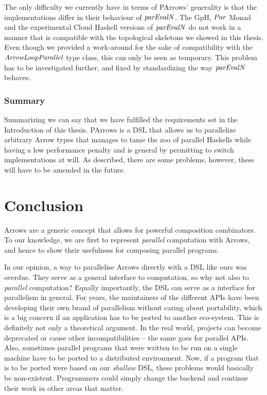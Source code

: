 \documentclass[paper=A4,twoside=true,openright,parskip=full,chapterprefix=true,headings=normal,bibliography=totoc,listof=totoc,titlepage=on,captions=tableabove,draft=false,british]{scrreprt}%
\begin{document}
The only difficulty we currently have in terms of PArrows' generality is
that the implementations differ in their behaviour of \ensuremath{\Varid{parEvalN}}. The
GpH, \ensuremath{\Conid{Par}} Monad and the experimental Cloud Haskell versions of
\ensuremath{\Varid{parEvalN}} do not work in a manner that is compatible with the
topological skeletons we showed in this thesis. Even though we provided
a work-around for the sake of compatibility with the \ensuremath{\Conid{ArrowLoopParallel}}
type class, this can only be seen as temporary. This problem has to be
investigated further, and fixed by standardizing the way \ensuremath{\Varid{parEvalN}}
behaves.

\hypertarget{summary}{%
\subsubsection{Summary}\label{summary}}

Summarizing we can say that we have fulfilled the requirements set in
the Introduction of this thesis. PArrows is a DSL that allows us to
parallelize arbitrary Arrow types that manages to tame the zoo of
parallel Haskells while having a low performance penalty and is general
by permitting to switch implementations at will. As described, there are
some problems, however, these will have to be amended in the future.

\hypertarget{conclusion}{%
\section{Conclusion}\label{conclusion}}

\label{sec:outlookConclusion}

Arrows are a generic concept that allows for powerful composition
combinators. To our knowledge, we are first to represent \emph{parallel}
computation with Arrows, and hence to show their usefulness for
composing parallel programs.

In our opinion, a way to parallelise Arrows directly with a DSL like
ours was overdue. They serve as a general interface to computation, so
why not also to \emph{parallel} computation? Equally importantly, the
DSL can serve as a interface for parallelism in general. For years, the
maintainers of the different APIs have been developing their own brand
of parallelism without caring about portability, which is a big concern
if an application has to be ported to another eco-system. This is
definitely not only a theoretical argument. In the real world, projects
can become deprecated or cause other incompatibilities -- the same goes
for parallel APIs. Also, sometimes parallel programs that were written
to be run on a single machine have to be ported to a distributed
environment. Now, if a program that is to be ported were based on our
\emph{shallow} DSL, these problems would basically be non-existent.
Programmers could simply change the backend and continue their work in
other areas that matter.
\end{document}
